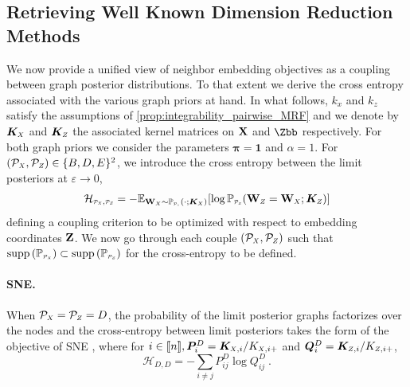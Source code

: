 \subsection{Retrieving Well Known Dimension Reduction Methods}\label{sec:retrieving_DR_methods}

We now provide a unified view of neighbor embedding objectives as a coupling between graph posterior distributions. To that extent we derive the cross entropy associated with the various graph priors at hand. In what follows, $k_x$ and $k_z$ satisfy the assumptions of \cref{prop:integrability_pairwise_MRF} and we denote by $\bm{K}_{\scaleto{X}{4pt}}$ and $\bm{K}_{\scaleto{Z}{4pt}}$ the associated kernel matrices on  $\mathbf{X}$ and $\Zbb$ respectively. For both graph priors we consider the parameters $\bm{\pi}=\bm{1}$ and $\alpha=1$. For $(\mathcal{P}_{\scaleto{X}{4pt}}, \mathcal{P}_{\scaleto{Z}{4pt}}) \in \{B,D,E\}^2$, we introduce the 
cross entropy between the limit posteriors at $\varepsilon \to 0$,
\begin{align*}
    \mathcal{H}_{\scaleto{\mathcal{P}_X}{4pt}, \scaleto{\mathcal{P}_Z}{4pt}} = - \mathbb{E}_{\Wb_{\scaleto{X}{3pt}} \sim \mathbb{P}_{\scaleto{\mathcal{P}_{\scaleto{X}{2pt}}}{3pt}}(\cdot;\bm{K}_{\scaleto{X}{3pt}})}[\log \mathbb{P}_{\scaleto{\mathcal{P}_{\scaleto{Z}{3pt}}}{4pt}}(\Wb_{\scaleto{Z}{4pt}} = \Wb_{\scaleto{X}{4pt}}; \bm{K}_{\scaleto{Z}{4pt}})]
\end{align*}
defining a coupling criterion to be optimized with respect to embedding coordinates $\mathbf{Z}$. We now go through each couple $(\mathcal{P}_{\scaleto{X}{4pt}}, \mathcal{P}_{\scaleto{Z}{4pt}})$ such that $\operatorname{supp}\left(\mathbb{P}_{\scaleto{\mathcal{P}_X}{4pt}}\right) \subset \operatorname{supp}\left(\mathbb{P}_{\scaleto{\mathcal{P}_Z}{4pt}}\right)$ for the cross-entropy to be defined.

\paragraph{SNE.}
When $\mathcal{P}_{\scaleto{X}{4pt}} = \mathcal{P}_{\scaleto{Z}{4pt}} = D$, the probability of the limit posterior graphs factorizes over the nodes and the cross-entropy between limit posteriors takes the form of the objective of SNE \cite{hinton2002stochastic}, where for $i \in \integ{n}, \bm{P}^{D}_{i} = \bm{K}_{\scaleto{X}{4pt},i} / K_{\scaleto{X}{4pt},i+}$ and $\bm{Q}^{D}_{i} = \bm{K}_{\scaleto{Z}{4pt},i} / K_{\scaleto{Z}{4pt},i+}$,
$$\mathcal{H}_{D,D}= - \sum_{i \neq j} P^{D}_{ij} \log Q^{D}_{ij} \:.$$

